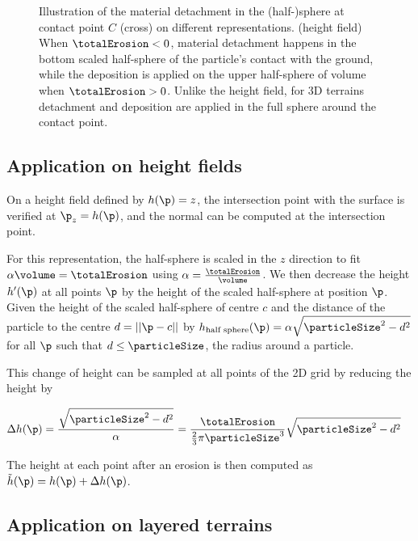 \begin{figure}
    \centering
    \caption{Illustration of the material detachment in the (half-)sphere at contact point $C$ (cross) on different representations. (height field) When $\totalErosion < 0$, material detachment happens in the bottom scaled half-sphere of the particle's contact with the ground, while the deposition is applied on the upper half-sphere of volume when $\totalErosion > 0$. Unlike the height field, for 3D terrains detachment and deposition are applied in the full sphere around the contact point.}
    \label{fig:erosion-erosion-heightfield}
\end{figure}

\subsection{Application on height fields}
\label{sec:erosion-application_on_heightmaps}

On a height field defined by $h(\p) = z$, the intersection point with the surface is verified at $\p_z = h(\p)$, and the normal can be computed at the intersection point. 

For this representation, the half-sphere is scaled in the $z$ direction to fit $\alpha \volume = \totalErosion$ using $\alpha = \frac{\totalErosion}{\volume}$. We then decrease the height $h'(\p)$ at all points $\p$ by the height of the scaled half-sphere at position $\p$. Given the height of the scaled half-sphere of centre $c$ and the distance of the particle to the centre $d = ||\p - c||$ by $h_\text{half sphere}(\p) = \alpha \sqrt{\particleSize^2 - d^2}$ for all $\p$ such that $d \leq \particleSize$, the radius around a particle.

This change of height can be sampled at all points of the 2D grid by reducing the height by 

\begin{align} 
    \label{eq:erosion-erosionHeightfield}
    \Delta h(\p) &= \frac{\sqrt{\particleSize^2 - d^2}}{\alpha} = \frac{\totalErosion}{\frac{2}{3} \pi \particleSize^3} \sqrt{\particleSize^2 - d^2}
\end{align}

The height at each point after an erosion is then computed as $\Tilde{h}(\p) = h(\p) + \Delta h(\p)$.


\subsection{Application on layered terrains}
\label{sec:erosion-application_on_layers}

